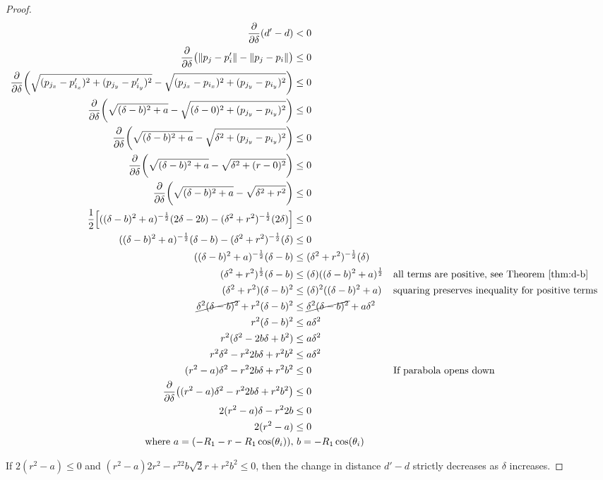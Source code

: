 \documentclass[conference]{IEEEtran}
\begin{document}
\begin{proof}
    \begin{align*}
      \frac{\partial}{\partial\delta}(d'-d) &< 0 \\
      \frac{\partial}{\partial\delta}\big(\lVert p_j - p'_i \rVert - \lVert p_j - p_i \rVert\big) &\leq 0 \\
      \frac{\partial}{\partial\delta}\bigg(\sqrt{(p_{j_x} - p'_{i_x})^2 + (p_{j_y} - p'_{i_y})^2} - \sqrt{(p_{j_x} - p_{i_x})^2 + (p_{j_y} - p_{i_y})^2}\bigg) &\leq 0 \\
      \frac{\partial}{\partial\delta}\bigg(\sqrt{(\delta - b)^2 + a} - \sqrt{(\delta - 0)^2 + (p_{j_y} - p_{i_y})^2}\bigg) &\leq 0 \\
      \frac{\partial}{\partial\delta}\bigg(\sqrt{(\delta - b)^2 + a} - \sqrt{\delta^2 + (p_{j_y} - p_{i_y})^2}\bigg) &\leq 0 \\
      \frac{\partial}{\partial\delta}\bigg(\sqrt{(\delta-b)^2 + a} - \sqrt{\delta^2 + (r-0)^2}\bigg) &\leq 0 \\
      \frac{\partial}{\partial\delta}\bigg(\sqrt{(\delta-b)^2 + a} - \sqrt{\delta^2 + r^2}\bigg) &\leq 0 \\
      \frac{1}{2}\Big[((\delta-b)^2 + a)^{-\frac{1}{2}}(2\delta-2b) - (\delta^2 + r^2)^{-\frac{1}{2}}(2\delta)\Big] &\leq 0 \\
      ((\delta-b)^2 + a)^{-\frac{1}{2}}(\delta-b) - (\delta^2 + r^2)^{-\frac{1}{2}}(\delta) &\leq 0 \\
      ((\delta-b)^2 + a)^{-\frac{1}{2}}(\delta-b) &\leq (\delta^2 + r^2)^{-\frac{1}{2}}(\delta) \\
      (\delta^2 + r^2)^{\frac{1}{2}}(\delta-b) &\leq (\delta)((\delta-b)^2 + a)^{\frac{1}{2}} && \text{all terms are positive, see Theorem \ref{thm:d-b}} \\
      (\delta^2 + r^2)(\delta-b)^2 &\leq (\delta)^2((\delta-b)^2 + a) && \text{squaring preserves inequality for positive terms} \\
      \cancel{\delta^2(\delta-b)^2} + r^2(\delta-b)^2 &\leq \cancel{\delta^2(\delta-b)^2} + a\delta^2 \\
      r^2(\delta-b)^2 &\leq a\delta^2 \\
      r^2(\delta^2-2b\delta+b^2) &\leq a\delta^2 \\
      r^2\delta^2 - r^22b\delta + r^2b^2 &\leq a\delta^2 \\
      (r^2 - a)\delta^2 - r^22b\delta + r^2b^2 &\leq 0 && \text{If parabola opens down} \\
      \frac{\partial}{\partial\delta}\big((r^2 - a)\delta^2 - r^22b\delta + r^2b^2\big) &\leq 0 \\
      2(r^2 - a)\delta - r^22b &\leq 0 \\
      2(r^2 - a) &\leq 0 \\
      \text{where}\  a=(-R_1-r-R_1\cos(\theta_i)),&\  b=-R_1\cos(\theta_i)
    \end{align*}

    If $2(r^2 - a) \leq 0$ and $(r^2 - a)2r^2 - r^22b\sqrt{2}r + r^2b^2 \leq 0$, then the change in distance $d'-d$ strictly decreases as $\delta$ increases.
  \end{proof}
\end{document}

